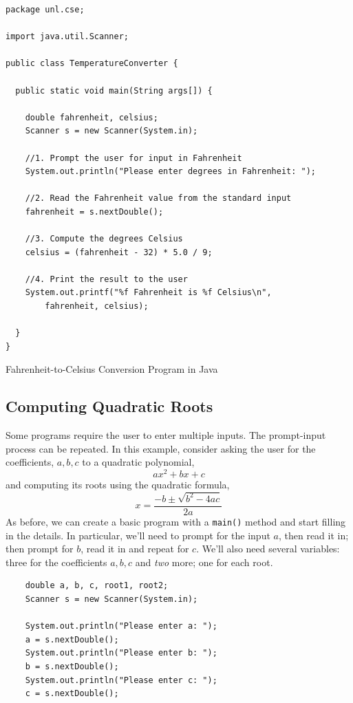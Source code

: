 \begin{listing}[H]
\begin{verbatim}
package unl.cse;

import java.util.Scanner;

public class TemperatureConverter {

  public static void main(String args[]) {

    double fahrenheit, celsius;
    Scanner s = new Scanner(System.in);

    //1. Prompt the user for input in Fahrenheit
    System.out.println("Please enter degrees in Fahrenheit: ");
      
    //2. Read the Fahrenheit value from the standard input
    fahrenheit = s.nextDouble();
      
    //3. Compute the degrees Celsius
    celsius = (fahrenheit - 32) * 5.0 / 9;
      
    //4. Print the result to the user
    System.out.printf("%f Fahrenheit is %f Celsius\n", 
    	fahrenheit, celsius);

  }
}
\end{verbatim}
\caption{Fahrenheit-to-Celsius Conversion Program in Java}
\label{code:java:fahrenheitToCelsiusProgram}
\end{listing}

\subsection{Computing Quadratic Roots}

Some programs require the user to enter multiple inputs.  The 
prompt-input process can be repeated.  In this example, consider asking
the user for the coefficients, $a, b, c$ to a quadratic polynomial, 
  $$ax^2 + bx + c$$
and computing its roots using the quadratic formula, 
  $$x = \frac{-b \pm \sqrt{b^2 - 4ac}}{2a}$$
As before, we can create a basic program with a \texttt{main()}
method and start filling in the details.  In particular, we'll need to prompt
for the input $a$, then read it in; then prompt for $b$, read it in and
repeat for $c$.  We'll also need several variables: three for the coefficients
$a, b, c$ and \emph{two} more; one for each root. 

\begin{verbatim}
    double a, b, c, root1, root2;
    Scanner s = new Scanner(System.in);

    System.out.println("Please enter a: ");
    a = s.nextDouble();
    System.out.println("Please enter b: ");
    b = s.nextDouble();
    System.out.println("Please enter c: ");
    c = s.nextDouble();
\end{verbatim}

